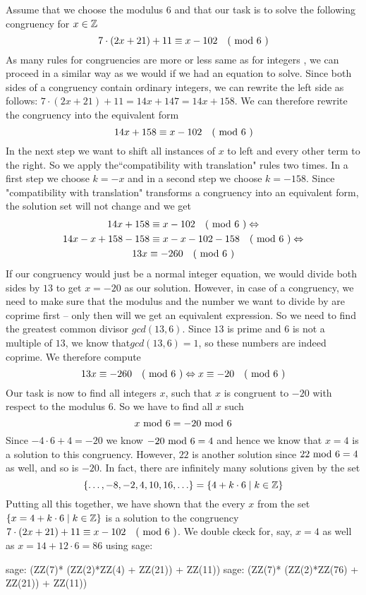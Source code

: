 \begin{example}
\label{example_first_congruency}
Assume that we choose the modulus $6$ and that our task is to solve the following congruency for $x\in \mathbb{Z}$
$$7\cdot(2x+21) + 11 \equiv x-102 \quad \text{( mod } 6 \text{ )}$$
As many rules for congruencies are more or less same as for integers , we can proceed in a  similar way as we would if we had an equation to solve. 
Since both sides of a congruency contain ordinary integers, we can rewrite the left side as follows: $7\cdot(2x+21) + 11 = 14x + 147 = 14x +158$. We can therefore rewrite the congruency into the equivalent form
$$14x +158 \equiv x-102 \quad \text{( mod } 6 \text{ )}$$
In the next step we want to shift all instances of $x$ to left and every other term to the right. So we apply the``compatibility with translation" rules two times. In a first step we choose $k=-x$ and in a second step we choose $k=-158$. Since "compatibility with translation" transforms a congruency into an equivalent form, the solution set will not change and we get 
\begin{multline*}
14x +158 \equiv x-102 \quad \text{( mod } 6 \text{ )} \Leftrightarrow\\
14x-x +158-158 \equiv x-x-102-158 \quad \text{( mod } 6 \text{ )} \Leftrightarrow \\
13x \equiv -260 \quad \text{( mod } 6 \text{ )}
\end{multline*}
If our congruency would just be a normal integer equation, we would divide both sides by $13$ to get $x=-20$ as our solution. However, in case of a congruency, we need to make sure that the modulus and the number we want to divide by are coprime first – only then will we get an equivalent expression. So we need to find the greatest common divisor $gcd(13,6)$. Since $13$ is prime and $6$ is not a multiple of $13$, we know that$gcd(13,6)=1$, so these numbers are indeed coprime. We therefore compute 
$$
13x \equiv -260 \quad \text{( mod } 6 \text{ )} \Leftrightarrow x \equiv -20 \quad \text{( mod } 6 \text{ )}
$$
Our task is now to find all integers $x$, such that $x$ is congruent to $-20$ with respect to the modulus $6$. So we have to find all $x$ such
$$
x \text{ mod } 6 = -20 \text{ mod } 6
$$
Since $-4\cdot 6 +4 = -20$ we know $ -20 \text{ mod } 6 = 4$ and hence we know that $x=4$ is a solution to this congruency. However, $22$ is another solution since $ 22 \text{ mod } 6 = 4$ as well, and so is $-20$. In fact, there are infinitely many solutions given by the set
$$
\{\ldots, -8,-2, 4,10, 16,\ldots\} = \{4+k\cdot 6 \;|\; k\in \mathbb{Z}\}
$$
Putting all this together, we have shown that the every $x$ from the set $\{x=4+k\cdot 6 \;|\; k\in \mathbb{Z}\}$ is a solution to the congruency $7\cdot(2x+21) + 11 \equiv x-102 \quad \text{( mod } 6 \text{ )}$. We double ckeck for, say, $x=4$ as well as $x=14 + 12\cdot 6 = 86$ using sage:
\begin{sagecommandline}
sage: (ZZ(7)* (ZZ(2)*ZZ(4) + ZZ(21)) + ZZ(11))  %
sage: (ZZ(7)* (ZZ(2)*ZZ(76) + ZZ(21)) + ZZ(11))  %
\end{sagecommandline}
\end{example}
